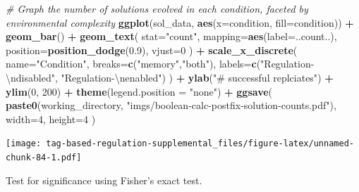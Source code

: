 \documentclass[
]{book}
\newenvironment{Shaded}{\begin{snugshade}}{\end{snugshade}}
\newcommand{\CharTok}[1]{\textcolor[rgb]{0.31,0.60,0.02}{#1}}
\newcommand{\CommentTok}[1]{\textcolor[rgb]{0.56,0.35,0.01}{\textit{#1}}}
\newcommand{\DataTypeTok}[1]{\textcolor[rgb]{0.13,0.29,0.53}{#1}}
\newcommand{\DecValTok}[1]{\textcolor[rgb]{0.00,0.00,0.81}{#1}}
\newcommand{\FloatTok}[1]{\textcolor[rgb]{0.00,0.00,0.81}{#1}}
\newcommand{\KeywordTok}[1]{\textcolor[rgb]{0.13,0.29,0.53}{\textbf{#1}}}
\newcommand{\NormalTok}[1]{#1}
\newcommand{\OperatorTok}[1]{\textcolor[rgb]{0.81,0.36,0.00}{\textbf{#1}}}
\newcommand{\StringTok}[1]{\textcolor[rgb]{0.31,0.60,0.02}{#1}}
\begin{document}
\begin{Shaded}
\begin{Highlighting}[]
\CommentTok{\# Graph the number of solutions evolved in each condition, faceted by environmental complexity}
\KeywordTok{ggplot}\NormalTok{(sol\_data, }\KeywordTok{aes}\NormalTok{(}\DataTypeTok{x=}\NormalTok{condition, }\DataTypeTok{fill=}\NormalTok{condition)) }\OperatorTok{+}
\StringTok{  }\KeywordTok{geom\_bar}\NormalTok{() }\OperatorTok{+}
\StringTok{  }\KeywordTok{geom\_text}\NormalTok{(}
    \DataTypeTok{stat=}\StringTok{"count"}\NormalTok{,}
    \DataTypeTok{mapping=}\KeywordTok{aes}\NormalTok{(}\DataTypeTok{label=}\NormalTok{..count..),}
    \DataTypeTok{position=}\KeywordTok{position\_dodge}\NormalTok{(}\FloatTok{0.9}\NormalTok{),}
    \DataTypeTok{vjust=}\DecValTok{0}
\NormalTok{  ) }\OperatorTok{+}
\StringTok{  }\KeywordTok{scale\_x\_discrete}\NormalTok{(}
    \DataTypeTok{name=}\StringTok{"Condition"}\NormalTok{,}
    \DataTypeTok{breaks=}\KeywordTok{c}\NormalTok{(}\StringTok{"memory"}\NormalTok{,}\StringTok{"both"}\NormalTok{),}
    \DataTypeTok{labels=}\KeywordTok{c}\NormalTok{(}\StringTok{"Regulation{-}}\CharTok{\textbackslash{}n}\StringTok{disabled"}\NormalTok{, }\StringTok{"Regulation{-}}\CharTok{\textbackslash{}n}\StringTok{enabled"}\NormalTok{)}
\NormalTok{  ) }\OperatorTok{+}
\StringTok{  }\KeywordTok{ylab}\NormalTok{(}\StringTok{"\# successful replciates"}\NormalTok{) }\OperatorTok{+}
\StringTok{  }\KeywordTok{ylim}\NormalTok{(}\DecValTok{0}\NormalTok{, }\DecValTok{200}\NormalTok{) }\OperatorTok{+}
\StringTok{  }\KeywordTok{theme}\NormalTok{(}\DataTypeTok{legend.position =} \StringTok{"none"}\NormalTok{) }\OperatorTok{+}
\StringTok{  }\KeywordTok{ggsave}\NormalTok{(}
    \KeywordTok{paste0}\NormalTok{(working\_directory, }\StringTok{"imgs/boolean{-}calc{-}postfix{-}solution{-}counts.pdf"}\NormalTok{),}
    \DataTypeTok{width=}\DecValTok{4}\NormalTok{,}
    \DataTypeTok{height=}\DecValTok{4}
\NormalTok{  )}
\end{Highlighting}
\end{Shaded}

\texttt{[image: tag-based-regulation-supplemental\_files/figure-latex/unnamed-chunk-84-1.pdf]}

Test for significance using Fisher's exact test.
\end{document}

